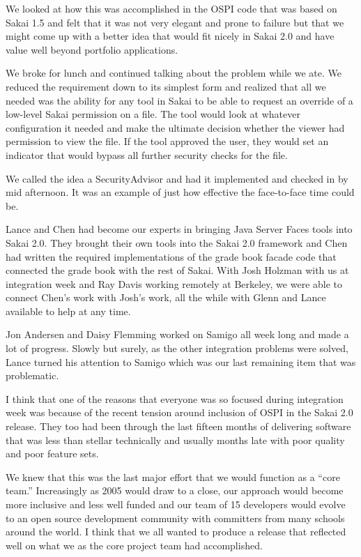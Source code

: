 \documentclass[12pt]{book}
\begin{document}
We looked at how this was accomplished in the OSPI code that
was based on Sakai 1.5 and felt that it was not very elegant
and prone to failure but that we might come up with a better
idea that would fit nicely in Sakai 2.0 and have value well
beyond portfolio applications.

We broke for lunch and continued talking about the problem
while we ate.  We reduced the requirement down to its simplest
form and realized that all we needed was the ability for any
tool in Sakai to be able to request an override
of a low-level Sakai permission on a file.  The tool would
look at whatever configuration it needed and make the
ultimate decision whether the viewer had permission to view
the file.   If the tool approved the user, they would set
an indicator that would bypass all further security checks
for the file.

We called the idea a SecurityAdvisor and had it
implemented and checked in by mid afternoon.  It was an
example of just how effective the face-to-face time could be.

Lance and Chen had become our experts in bringing Java
Server Faces tools into Sakai 2.0.   They brought their own tools
into the Sakai 2.0 framework and Chen had written the
required implementations of the grade book facade code that
connected the grade book with the rest of Sakai.
With Josh Holzman with us at integration week and Ray Davis
working remotely at Berkeley, we were able to connect
Chen's work with Josh's work, all the while with Glenn
and Lance available to help at any time.

Jon Andersen and Daisy Flemming worked on Samigo all week
long and made a lot of progress.  Slowly but surely, as the
other integration problems were solved, Lance turned his
attention to Samigo which was our last remaining item that
was problematic.

I think that one of the reasons that everyone was so
focused during integration week was because of
the recent tension around inclusion of OSPI in the
Sakai 2.0 release.
They too had been through the last fifteen months of
delivering software that was less than stellar technically
and usually months late with poor quality and poor feature
sets.

We knew that this was the last major effort that we would
function as a ``core team.''   Increasingly as 2005 would draw
to a close, our approach would become more inclusive and
less well funded and our team of 15 developers would evolve
to an open source development community with committers
from many schools around the world.  I think that we all
wanted to produce a release that reflected well on what we
as the core project team had accomplished.
\end{document}
